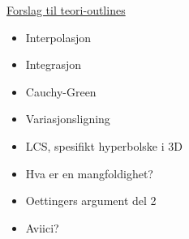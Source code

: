



\begin{framed}
    \underline{Forslag til teori-outlines}
    \begin{itemize}
        \item Interpolasjon
        \item Integrasjon
        \item Cauchy-Green
        \item Variasjonsligning
        \item LCS, spesifikt hyperbolske i 3D
        \item Hva er en mangfoldighet?
        \item Oettingers argument del 2
            \item Aviici?
    \end{itemize}
\end{framed}
